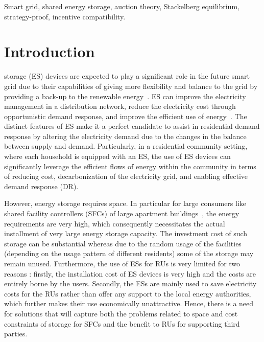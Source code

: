 \documentclass[journal,10pt]{IEEEtran}
\begin{document}
\begin{IEEEkeywords}
Smart grid, shared energy storage, auction theory, Stackelberg equilibrium, strategy-proof, incentive compatibility.
\end{IEEEkeywords}
 \setcounter{page}{1}
\section{Introduction}\label{sec:introduction}
 storage (ES) devices are expected to play a significant role in the future smart grid due to their capabilities of giving more flexibility and balance to the grid by providing a back-up to the renewable energy~\cite{Silvestre-TII:2014,Garcia-TII:2014,Fang-J-CST:2012,Liu-STSP:2014,YiLiu-TIE:2015,Naveed-TSG:2015,Naveed-Elsevier:2016,Tushar-ITS:2015,Shisheng-Elsevier:2015}. ES can improve the electricity management in a distribution network, reduce the electricity cost through opportunistic demand response, and improve the efficient use of energy~\cite{Wang-JTSG:2013}. The distinct features of ES make it a perfect candidate to assist in residential demand response by altering the electricity demand due to the changes in the balance between supply and demand. Particularly, in a residential community setting, where each household is equipped with an ES, the use of ES devices can significantly leverage the efficient flows of energy within the community in terms of reducing cost, decarbonization of the electricity grid, and enabling effective demand response (DR).

However, energy storage requires space. In particular for large consumers like shared facility controllers (SFCs) of large apartment buildings~\cite{Tushar-TIE:2014}, the energy requirements are very high, which consequently necessitates the actual installment of very large energy storage capacity. The investment cost of such storage can be substantial whereas due to the random usage of the facilities (depending on the usage pattern of different residents) some of the storage may remain unused. Furthermore, the use of ESs for RUs is very limited for two reasons \cite{Wang-JTSG:2013}: firstly, the installation cost of ES devices is very high and the costs are entirely borne by the users. Secondly, the ESs are mainly used to save electricity costs for the RUs rather than offer any support to the local energy authorities, which further makes their use economically unattractive. Hence, there is a need for solutions that will capture both the problems related to space and cost constraints of storage for SFCs and the benefit to RUs for supporting third parties.
\end{document}
